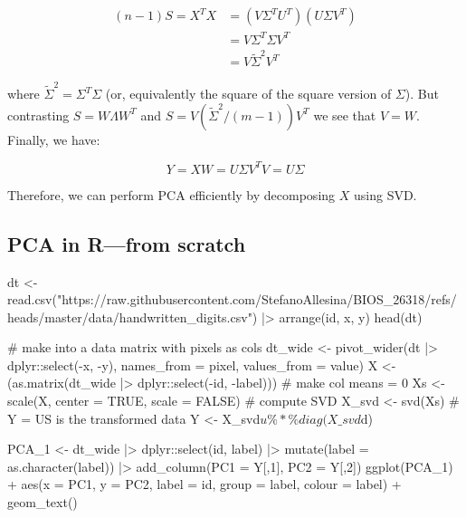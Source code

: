 \documentclass[
  letterpaper,
  DIV=11,
  numbers=noendperiod]{scrreprt}
\newenvironment{Shaded}{\begin{snugshade}}{\end{snugshade}}
\newcommand{\NormalTok}[1]{\textcolor[rgb]{0.00,0.23,0.31}{#1}}
\begin{document}
\[
\begin{aligned}
(n-1) S = X^T X &= (V \Sigma^T U^T) (U \Sigma V^T)\\
&= V \Sigma^T \Sigma V^T\\
&= V \widetilde{\Sigma}^2 V^T
\end{aligned}
\]

where \(\widetilde{\Sigma}^2 = \Sigma^T \Sigma\) (or, equivalently the
square of the square version of \(\Sigma\)). But contrasting
\(S = W \Lambda W^T\) and \(S = V (\widetilde{\Sigma}^2 / (m-1))V^T\) we
see that \(V = W\). Finally, we have:

\[
Y = X W = U \Sigma V^T V = U\Sigma
\]

Therefore, we can perform PCA efficiently by decomposing \(X\) using
SVD.

\subsection{PCA in R---from scratch}\label{pca-in-rfrom-scratch}

\begin{Shaded}
\begin{Highlighting}[]
\NormalTok{dt \textless{}{-} read.csv("https://raw.githubusercontent.com/StefanoAllesina/BIOS\_26318/refs/heads/master/data/handwritten\_digits.csv") |\textgreater{} }
\NormalTok{  arrange(id, x, y)}
\NormalTok{head(dt)}
\end{Highlighting}
\end{Shaded}

\begin{Shaded}
\begin{Highlighting}[]
\NormalTok{\# make into a data matrix with pixels as cols}
\NormalTok{dt\_wide \textless{}{-} pivot\_wider(dt |\textgreater{} dplyr::select({-}x, {-}y), }
\NormalTok{                       names\_from = pixel, }
\NormalTok{                       values\_from = value)}
\NormalTok{X \textless{}{-} (as.matrix(dt\_wide |\textgreater{} dplyr::select({-}id, {-}label)))}
\NormalTok{\# make col means = 0}
\NormalTok{Xs \textless{}{-} scale(X, center = TRUE, scale = FALSE)}
\NormalTok{\# compute SVD}
\NormalTok{X\_svd \textless{}{-} svd(Xs)}
\NormalTok{\# Y = US is the transformed data}
\NormalTok{Y \textless{}{-} X\_svd$u \%*\% diag(X\_svd$d)}
\end{Highlighting}
\end{Shaded}

\begin{Shaded}
\begin{Highlighting}[]
\NormalTok{PCA\_1 \textless{}{-} dt\_wide |\textgreater{} }
\NormalTok{  dplyr::select(id, label) |\textgreater{} }
\NormalTok{  mutate(label = as.character(label)) |\textgreater{} }
\NormalTok{  add\_column(PC1 = Y[,1], PC2 = Y[,2])}
\NormalTok{ggplot(PCA\_1) + }
\NormalTok{  aes(x = PC1, y = PC2, label = id, group = label, colour = label) + }
\NormalTok{  geom\_text()}
\end{Highlighting}
\end{Shaded}
\end{document}
